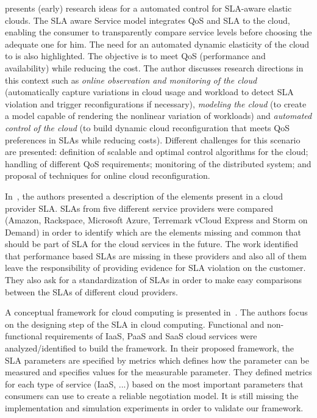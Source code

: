 \documentclass[12pt,a4paper,oneside]{article}
\begin{document}
\bigskip
\cite{013} presents (early) research ideas for a automated control for SLA-aware elastic clouds. The SLA aware Service model integrates QoS and SLA to the cloud, enabling the consumer to transparently compare service levels before choosing the adequate one for him. The need for an automated dynamic elasticity of the cloud to is also highlighted. The objective is to meet QoS (performance and availability) while reducing the cost. The author discusses research directions in this context such as \textit{online observation and monitoring of the cloud} (automatically capture variations in cloud usage and workload to detect SLA violation and trigger reconfigurations if necessary), \textit{modeling the cloud} (to create a model capable of rendering the nonlinear variation of workloads) and \textit{automated control of the cloud} (to build dynamic cloud reconfiguration that meets QoS preferences in SLAs while reducing costs). Different challenges for this scenario are presented: definition of scalable and optimal control algorithms for the cloud; handling of different QoS requirements; monitoring of the distributed system; and proposal of techniques for online cloud reconfiguration.

\bigskip
In~\cite{010}, the authors presented a description of the elements present in a cloud provider SLA. SLAs from five different service providers were compared (Amazon, Rackspace, Microsoft Azure, Terremark vCloud Express and Storm on Demand) in order to identify which are the elements missing and common that should be part of SLA for the cloud services in the future. The work identified that performance based SLAs are missing in these providers and also all of them leave the responsibility of providing evidence for SLA violation on the customer. They also ask for a standardization of SLAs in order to make easy comparisons between the SLAs of different cloud providers.

\bigskip
A conceptual framework for cloud computing is presented in~\cite{005}. The authors focus on the designing step of the SLA in cloud computing. Functional and non-functional requirements of IaaS, PaaS and SaaS cloud services were analyzed/identified to build the framework. In their proposed framework, the SLA parameters are specified by metrics which defines how the parameter can be measured and specifies values for the measurable parameter. They defined metrics for each type of service (IaaS, ...) based on the most important parameters that consumers can use to create a reliable negotiation model. It is still missing the implementation and simulation experiments in order to validate our framework.
\end{document}
